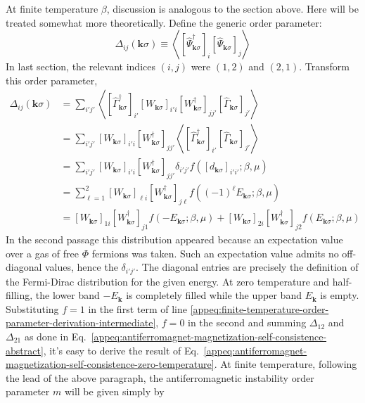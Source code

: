 At finite temperature $\beta$, discussion is analogous to the section above. Here will be treated somewhat more theoretically. Define the generic order parameter:
\[
	\Delta_{ij} (\mathbf{k}\sigma) \equiv \left\langle
		[
			\hat \Psi_{\mathbf{k}\sigma}^\dagger
		]_i [
			\hat \Psi_{\mathbf{k}\sigma}
		]_j
	\right\rangle
\]
In last section, the relevant indices $(i,j)$ were $(1,2)$ and $(2,1)$. Transform this order parameter,
\begin{align}
	\Delta_{ij} (\mathbf{k}\sigma) &= \sum_{i'j'} \left\langle
		[
			\hat\Gamma_{\mathbf{k}\sigma}^\dagger
		]_{i'} 
		[
			W_{\mathbf{k}\sigma}
		]_{i'i} [
			W_{\mathbf{k}\sigma}^\dagger
		]_{jj'}
		[
			\hat\Gamma_{\mathbf{k}\sigma}
		]_{j'}
	\right\rangle \nonumber \\
	&= 
	\sum_{i'j'} [
		W_{\mathbf{k}\sigma}
	]_{i'i} [
		W_{\mathbf{k}\sigma}^\dagger
	]_{jj'}
	\left\langle
		[
			\hat\Gamma_{\mathbf{k}\sigma}^\dagger
		]_{i'} 
		[
			\hat\Gamma_{\mathbf{k}\sigma}
		]_{j'}
	\right\rangle \nonumber \\
	&= 
	\sum_{i'j'} [
		W_{\mathbf{k}\sigma}
	]_{i'i} [
		W_{\mathbf{k}\sigma}^\dagger
	]_{jj'}
	\delta_{i'j'} f\left(
		[d_{\mathbf{k}\sigma}]_{i'i'}; \beta,\mu
	\right) \nonumber \\
	&= 
	\sum_{\ell=1}^2 [
		W_{\mathbf{k}\sigma}
	]_{\ell i} [
		W_{\mathbf{k}\sigma}^\dagger
	]_{j\ell}
	f\left(
		(-1)^\ell E_{\mathbf{k}\sigma}; \beta,\mu
	\right) \nonumber \\
	&= 
	[
		W_{\mathbf{k}\sigma}
	]_{1 i} [
		W_{\mathbf{k}\sigma}^\dagger
	]_{j 1} f\left(
		-E_{\mathbf{k}\sigma}; \beta,\mu
	\right) + [
		W_{\mathbf{k}\sigma}
	]_{2 i} [
		W_{\mathbf{k}\sigma}^\dagger
	]_{j 2} f\left(
		E_{\mathbf{k}\sigma}; \beta,\mu
	\right) \label{appeq:finite-temperature-order-parameter-derivation-intermediate}
\end{align}
In the second passage this distribution appeared because an expectation value over a gas of free $\Phi$ fermions was taken. Such an expectation value admits no off-diagonal values, hence the $\delta_{i'j'}$. The diagonal entries are precisely the definition of the Fermi-Dirac distribution for the given energy. At zero temperature and half-filling, the lower band $-E_\mathbf{k}$ is completely filled while the upper band $E_\mathbf{k}$ is empty. Substituting $f=1$ in the first term of line \eqref{appeq:finite-temperature-order-parameter-derivation-intermediate}, $f=0$ in the second and summing $\Delta_{12}$ and $\Delta_{21}$ as done in Eq.~\eqref{appeq:antiferromagnet-magnetization-self-consistence-abstract}, it's easy to derive the result of Eq.~\eqref{appeq:antiferromagnet-magnetization-self-consistence-zero-temperature}. At finite temperature, following the lead of the above paragraph, the antiferromagnetic instability order parameter $m$ will be given simply by
